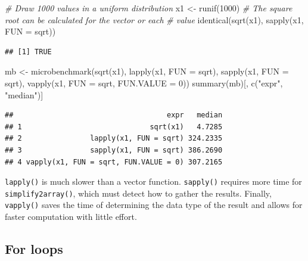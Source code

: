 \documentclass[
  12pt,
  american,
  a4paper,
  extrafontsizes,onecolumn,openright
  ]{memoir}
\newenvironment{Shaded}{\begin{snugshade}}{\end{snugshade}}
\newcommand{\AttributeTok}[1]{\textcolor[rgb]{0.77,0.63,0.00}{#1}}
\newcommand{\CommentTok}[1]{\textcolor[rgb]{0.56,0.35,0.01}{\textit{#1}}}
\newcommand{\DecValTok}[1]{\textcolor[rgb]{0.00,0.00,0.81}{#1}}
\newcommand{\FunctionTok}[1]{\textcolor[rgb]{0.00,0.00,0.00}{#1}}
\newcommand{\NormalTok}[1]{#1}
\newcommand{\OtherTok}[1]{\textcolor[rgb]{0.56,0.35,0.01}{#1}}
\newcommand{\StringTok}[1]{\textcolor[rgb]{0.31,0.60,0.02}{#1}}
\begin{document}
\scriptsize

\begin{Shaded}
\begin{Highlighting}[]
\CommentTok{\# Draw 1000 values in a uniform distribution}
\NormalTok{x1 }\OtherTok{\textless{}{-}} \FunctionTok{runif}\NormalTok{(}\DecValTok{1000}\NormalTok{)}
\CommentTok{\# The square root can be calculated for the vector or each}
\CommentTok{\# value}
\FunctionTok{identical}\NormalTok{(}\FunctionTok{sqrt}\NormalTok{(x1), }\FunctionTok{sapply}\NormalTok{(x1, }\AttributeTok{FUN =}\NormalTok{ sqrt))}
\end{Highlighting}
\end{Shaded}

\begin{verbatim}
## [1] TRUE
\end{verbatim}

\begin{Shaded}
\begin{Highlighting}[]
\NormalTok{mb }\OtherTok{\textless{}{-}} \FunctionTok{microbenchmark}\NormalTok{(}\FunctionTok{sqrt}\NormalTok{(x1), }\FunctionTok{lapply}\NormalTok{(x1, }\AttributeTok{FUN =}\NormalTok{ sqrt), }\FunctionTok{sapply}\NormalTok{(x1,}
    \AttributeTok{FUN =}\NormalTok{ sqrt), }\FunctionTok{vapply}\NormalTok{(x1, }\AttributeTok{FUN =}\NormalTok{ sqrt, }\AttributeTok{FUN.VALUE =} \DecValTok{0}\NormalTok{))}
\FunctionTok{summary}\NormalTok{(mb)[, }\FunctionTok{c}\NormalTok{(}\StringTok{"expr"}\NormalTok{, }\StringTok{"median"}\NormalTok{)]}
\end{Highlighting}
\end{Shaded}

\begin{verbatim}
##                                    expr   median
## 1                              sqrt(x1)   4.7285
## 2                lapply(x1, FUN = sqrt) 324.2335
## 3                sapply(x1, FUN = sqrt) 386.2690
## 4 vapply(x1, FUN = sqrt, FUN.VALUE = 0) 307.2165
\end{verbatim}

\normalsize

\texttt{lapply()} is much slower than a vector function.
\texttt{sapply()} requires more time for \texttt{simplify2array()}, which must detect how to gather the results.
Finally, \texttt{vapply()} saves the time of determining the data type of the result and allows for faster computation with little effort.

\hypertarget{for-loops}{%
\subsection{For loops}\label{for-loops}}
\end{document}
